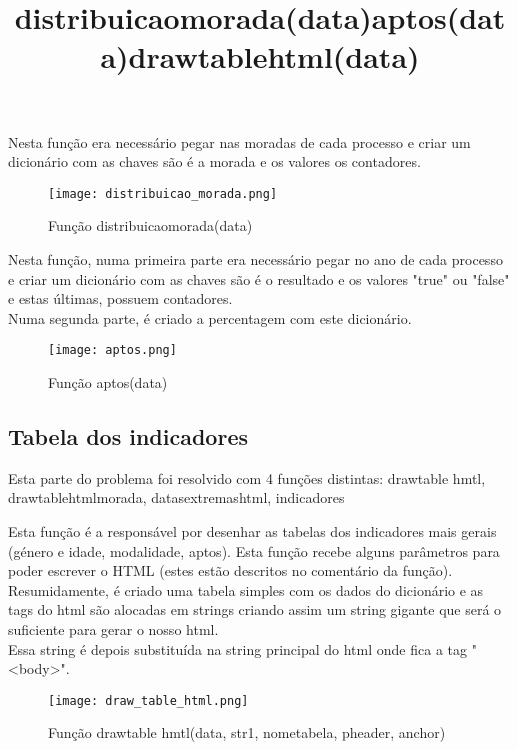 \documentclass[11pt,a4paper]{report}%
\begin{document}
\newpage
\title{\textbf{distribuicao\textunderscore morada(data)}}

Nesta função era necessário pegar nas moradas de cada processo e criar um dicionário com as chaves são é a morada e os valores os contadores.\\
\begin{figure}[htbp]
\centerline{\texttt{[image: distribuicao\_morada.png]}}
\caption{Função distribuicao\textunderscore morada(data)}
\label{fig}
\end{figure} 

\title{\textbf{aptos(data)}}

Nesta função, numa primeira parte era necessário pegar no ano de cada processo e criar um dicionário com as chaves são é o resultado e os valores "true" ou "false" e estas últimas, possuem contadores.\\
Numa segunda parte, é criado a percentagem com este dicionário.
\begin{figure}[htbp]
\centerline{\texttt{[image: aptos.png]}}
\caption{Função aptos(data)}
\label{fig}
\end{figure}  



\newpage
\subsection{Tabela dos indicadores} \label{subsec:indicadoresTable}
Esta parte do problema foi resolvido com 4 funções distintas: draw\textunderscore table \textunderscore hmtl, draw\textunderscore table\textunderscore html\textunderscore morada, datas\textunderscore extremas\textunderscore html, indicadores\\

\title{\textbf{draw\textunderscore table\textunderscore html(data)}}

Esta função é a responsável por desenhar as tabelas dos indicadores mais gerais (género e idade, modalidade, aptos).
Esta função recebe alguns parâmetros para poder escrever o HTML (estes estão descritos no comentário da função).\\
Resumidamente, é criado uma tabela simples com os dados do dicionário e as tags do html são alocadas em strings criando assim um string gigante que será o suficiente para gerar o nosso html.\\
Essa string é depois substituída na string principal do html onde fica a tag "<body>".


\begin{figure}[htbp]
\centerline{\texttt{[image: draw\_table\_html.png]}}
\caption{Função draw\textunderscore table \textunderscore hmtl(data, str1, nome\textunderscore tabela, p\textunderscore header, anchor)}
\label{fig}
\end{figure}  
\end{document}
